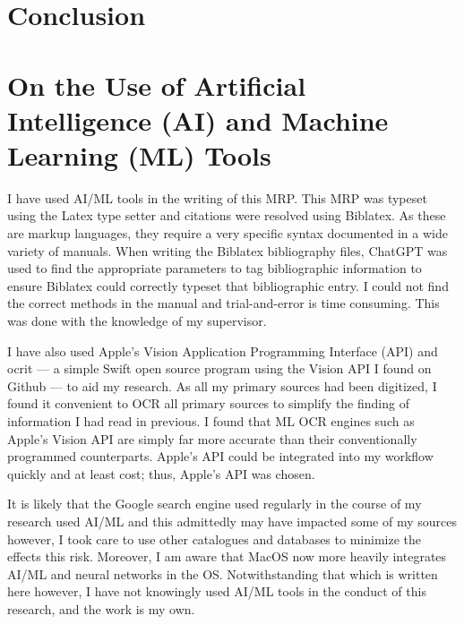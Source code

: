 \documentclass[noraggedright]{turabian-researchpaper}
\begin{document}
\section{Conclusion}

\newpage

\section{On the Use of Artificial Intelligence (AI) and Machine Learning 
(ML) Tools}

I have used AI/ML tools in the writing of this MRP.  This MRP was typeset
using the Latex type setter and citations were resolved using Biblatex.  As
these are markup languages, they require a very specific syntax documented in
a wide variety of manuals.  When writing the Biblatex bibliography files, 
ChatGPT was used to find the appropriate parameters to tag bibliographic 
information to ensure Biblatex could correctly typeset that bibliographic 
entry.  I could not find the correct methods in the manual and 
trial-and-error is time consuming.  This was done with the knowledge of my
supervisor.

I have also used Apple's Vision Application Programming Interface (API) and
ocrit --- a simple Swift open source program using the Vision API I found on 
Github --- to aid my research.  As all my primary sources had been digitized, 
I found it convenient to OCR all primary sources to simplify the finding of 
information I had read in previous.  I found that ML OCR engines such as 
Apple's Vision API are simply far more accurate than their conventionally
programmed counterparts.  Apple's API could be integrated into my workflow
quickly and at least cost; thus, Apple's API was chosen.

It is likely that the Google search engine used regularly in the course of
my research used AI/ML and this admittedly may have impacted some of my 
sources however, I took care to use other catalogues and databases to 
minimize the effects this risk.  Moreover, I am aware that MacOS now more
heavily integrates AI/ML and neural networks in the OS.  Notwithstanding that
which is written here however, I have not knowingly used AI/ML tools in the
conduct of this research, and the work is my own.

\newpage

\printbibliography
\end{document}

